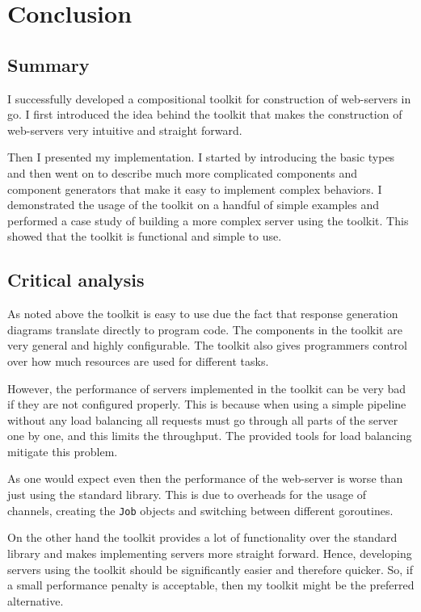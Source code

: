 \section{Conclusion}
\label{sec:conclusion}
\subsection{Summary}
I successfully developed a compositional toolkit for construction of 
web-servers in go. I first introduced the idea behind the toolkit that 
makes the construction of web-servers very intuitive and straight forward. 

Then I presented my implementation. I started by introducing the basic types
and then went on to describe much more complicated components and component generators
that make it easy to implement complex behaviors. I demonstrated the usage of the 
toolkit on a handful of simple examples and performed a case study of building
a more complex server using the toolkit. This showed that the toolkit is
functional and simple to use. 


\subsection{Critical analysis}
As noted above the toolkit is easy to use due the fact that response 
generation diagrams translate directly to program code. The components
in the toolkit are very general and highly configurable. The toolkit
also gives programmers control over how much resources are used for 
different tasks. 

However, the performance of servers implemented in the toolkit can be 
very bad if they are not configured properly. This is because when using a simple
pipeline without any load balancing all requests must go through all parts
of the server one by one, and this limits the throughput. The provided
tools for load balancing mitigate this problem.

As one would expect even then the performance of the web-server
is worse than just using the standard library. This is due to overheads
for the usage of channels, creating the \texttt{Job} objects
and switching between different goroutines.

On the other hand the toolkit provides a lot of functionality over the
standard library and makes implementing servers more straight forward. 
Hence, developing servers using the toolkit should be
significantly easier and therefore quicker. So, if a small performance
penalty is acceptable, then my toolkit might be the preferred alternative.

